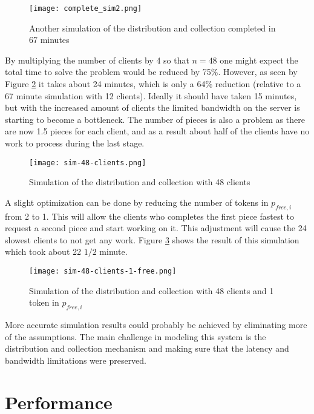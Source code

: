 \begin{figure}[htbp]
	\centering 
	\texttt{[image: complete\_sim2.png]}
	\caption{Another simulation of the distribution and collection completed in 67 minutes}
	\label{fig:complete_sim2}
\end{figure}

By multiplying the number of clients by 4 so that $n = 48$ one might expect the total time to solve the problem would be reduced by 75\%.
However, as seen by Figure \ref{fig:sim-48clients} it takes about 24 minutes, which is only a 64\% reduction (relative to a 67 minute simulation with 12 clients).
Ideally it should have taken 15 minutes, but with the increased amount of clients the limited bandwidth on the server is starting to become a bottleneck.
The number of pieces is also a problem as there are now 1.5 pieces for each client, and as a result about half of the clients have no work to process during the last stage.

\begin{figure}[tbp]
	\centering 
	\texttt{[image: sim-48-clients.png]}
	\caption{Simulation of the distribution and collection with 48 clients}
	\label{fig:sim-48clients}
\end{figure}

A slight optimization can be done by reducing the number of tokens in $p_{free,i}$ from 2 to 1.
This will allow the clients who completes the first piece fastest to request a second piece and start working on it.
This adjustment will cause the 24 slowest clients to not get any work.
Figure \ref{fig:sim-48clients-1free} shows the result of this simulation which took about 22 $1/2$ minute.

\begin{figure}[tbp]
	\centering 
	\texttt{[image: sim-48-clients-1-free.png]}
	\caption{Simulation of the distribution and collection with 48 clients and 1 token in $p_{free,i}$}
	\label{fig:sim-48clients-1free}
\end{figure}


More accurate simulation results could probably be achieved by eliminating more of the assumptions.
The main challenge in modeling this system is the distribution and collection mechanism and making sure that the latency and bandwidth limitations were preserved.




\section{Performance}


